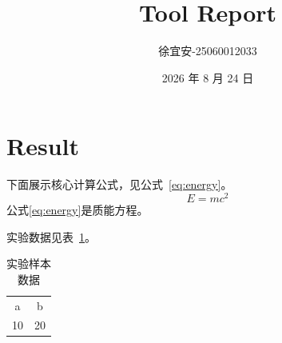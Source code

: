 \documentclass{article}
\begin{document}
\title{Tool Report}
\author{徐宜安-25060012033}
\date{2026 年 8 月 24 日}
\maketitle
\section{Result}
下面展示核心计算公式，见公式~\ref{eq:energy}。
\begin{equation}
E = mc^2
\label{eq:energy}
\end{equation}
公式\eqref{eq:energy}是质能方程。

实验数据见表~\ref{tab:data}。
\begin{table}[h]
\centering
\caption{实验样本数据}
\label{tab:data}
\begin{tabular}{cc}
a & b \\
10 & 20 \\
\end{tabular}
\end{table}
\end{document}

